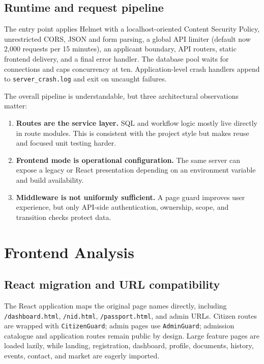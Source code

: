 \documentclass[12pt,a4paper,oneside]{report}
\newcommand{\code}[1]{\texttt{#1}}
\begin{document}
\section{Runtime and request pipeline}

The entry point applies Helmet with a localhost-oriented Content Security Policy, unrestricted
CORS, JSON and form parsing, a global API limiter (default now 2,000 requests per 15 minutes), an
applicant boundary, API routers, static frontend delivery, and a final error handler. The database
pool waits for connections and caps concurrency at ten. Application-level crash handlers append
to \code{server\_crash.log} and exit on uncaught failures.

The overall pipeline is understandable, but three architectural observations matter:

\begin{enumerate}
  \item \textbf{Routes are the service layer.} SQL and workflow logic mostly live directly in
        route modules. This is consistent with the project style but makes reuse and focused unit
        testing harder.
  \item \textbf{Frontend mode is operational configuration.} The same server can expose a legacy
        or React presentation depending on an environment variable and build availability.
  \item \textbf{Middleware is not uniformly sufficient.} A page guard improves user experience,
        but only API-side authentication, ownership, scope, and transition checks protect data.
\end{enumerate}

\chapter{Frontend Analysis}

\section{React migration and URL compatibility}

The React application maps the original page names directly, including
\code{/dashboard.html}, \code{/nid.html}, \code{/passport.html}, and admin URLs. Citizen routes
are wrapped with \code{CitizenGuard}; admin pages use \code{AdminGuard}; admission catalogue and
application routes remain public by design. Large feature pages are loaded lazily, while landing,
registration, dashboard, profile, documents, history, events, contact, and market are eagerly
imported.
\end{document}
